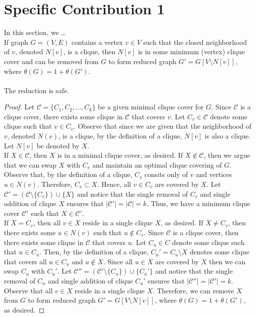 \documentclass[../techreport.tex]{subfiles}
\begin{document}
\section{Specific Contribution 1}
\label{sec:specific1}
In this section, we \ldots \\

 If graph $G = (V, E)$ contains a vertex $v \in V$ such that the closed neighborhood of $v$, denoted $N[v]$, is a clique, then $N[v]$ is in some minimum (vertex) clique cover and can be removed from $G$ to form reduced graph $G' = G[V \setminus N[v]]$, where $\theta(G) = 1 + \theta(G')$. \\ \\

 The reduction is safe.

\begin{proof}
	Let $\mathcal{C} = \{C_1, C_2, \dots, C_k\}$ be a given minimal clique cover for $G$. Since $\mathcal{C}$ is a clique cover, there exists some clique in $\mathcal{C}$ that covers $v$. Let $C_v \in \mathcal{C}$ denote some clique such that $v \in C_v$. Observe that since we are given that the neighborhood of $v$, denoted $N(v)$, is a clique, by the definition of a clique, $N[v]$ is also a clique. Let $N[v]$ be denoted by $X$. \\

	If $X \in \mathcal{C}$, then $X$ is in a minimal clique cover, as desired. If $X \notin \mathcal{C}$, then we argue that we can swap $X$ with $C_v$ and maintain an optimal clique covering of $G$. \\

	Observe that, by the definition of a clique, $C_v$ consits only of $v$ and vertices $u \in N(v)$. Therefore, $C_v \subset X$. Hence, all $v \in C_v$ are covered by $X$. Let $\mathcal{C'} = (\mathcal{C} \setminus \{C_v\}) \cup \{X\}$ and notice that the single removal of $C_v$ and single addition of clique $X$ ensures that $|\mathcal{C'}| = |\mathcal{C}| = k$. Thus, we have a minimum clique cover $\mathcal{C'}$ such that $X \in \mathcal{C'}$. \\

	If $X = C_v$, then all $v \in X$ reside in a single clique $X$, as desired. If $X \neq C_v$, then there exists some $u \in N(v)$ such that $u \notin C_v$. Since $\mathcal{C}$ is a clique cover, then there exists some clique in $\mathcal{C}$ that covers $u$. Let $C_u \in C$ denote some clique such that $u \in C_u$. Then, by the definition of a clique, $C_u' = C_u \setminus X$ denotes some clique that covers all $u \in C_u$ and $u \notin X$. Since all $u \in X$ are covered by $X$ then we can swap $C_u$ with $C_u'$. Let $\mathcal{C''} = (\mathcal{C'} \setminus \{C_u\}) \cup \{C_u'\}$ and notice that the single removal of $C_u$ and single addition of clique $C_u'$ ensures that $|\mathcal{C''}| = |\mathcal{C'}| = k$. \\

	Observe that all $v \in X$ reside in a single clique $X$. Therefore, we can remove $X$ from $G$ to form reduced graph $G' = G[V \setminus N[v]]$, where $\theta(G) = 1 + \theta(G')$, as desired.
\end{proof}
\end{document}
